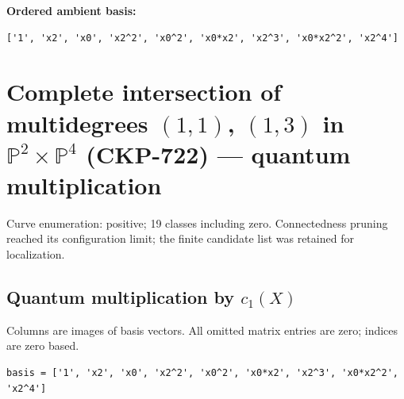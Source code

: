 \documentclass[10pt,a4paper]{article}
\begin{document}
\textbf{Ordered ambient basis:}
\begin{lstlisting}
['1', 'x2', 'x0', 'x2^2', 'x0^2', 'x0*x2', 'x2^3', 'x0*x2^2', 'x2^4']
\end{lstlisting}

\clearpage\section*{Complete intersection of multidegrees $(1,1)$, $(1,3)$ in $\mathbb P^{2}\times \mathbb P^{4}$ (CKP-722) --- quantum multiplication}

Curve enumeration: positive; 19 classes including zero.
Connectedness pruning reached its configuration limit; the finite candidate list was retained for localization.
\subsection*{Quantum multiplication by $c_1(X)$}
Columns are images of basis vectors. All omitted matrix entries are zero; indices are zero based.

\begin{lstlisting}
basis = ['1', 'x2', 'x0', 'x2^2', 'x0^2', 'x0*x2', 'x2^3', 'x0*x2^2', 'x2^4']
\end{lstlisting}
\end{document}
